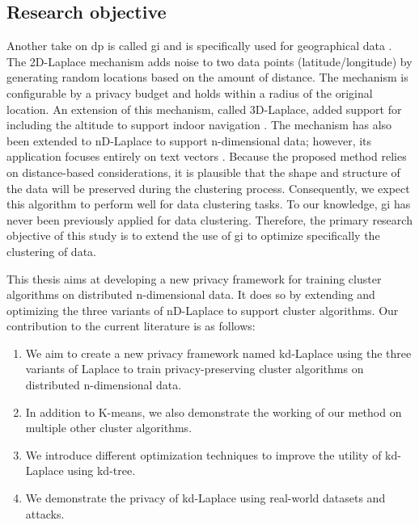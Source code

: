 \subsection*{Research objective}
Another take on \gls{dp} is called \gls{gi} and is specifically used for geographical data  \citep{DBLP:journals/corr/abs-1212-1984}.
The 2D-Laplace mechanism adds noise to two data points (latitude/longitude) by generating random locations based on the amount of distance.
The mechanism is configurable by a privacy budget and holds within a radius of the original location.
An extension of this mechanism, called 3D-Laplace, added support for including the altitude to support indoor navigation \citep{9646489}.
The mechanism has also been extended to nD-Laplace to support n-dimensional data; however, its application focuses entirely on text vectors \citep{fernandes_generalised_2019}. \newline
Because the proposed method relies on distance-based considerations, it is plausible that the shape and structure of the data will be preserved during the clustering process.
Consequently, we expect this algorithm to perform well for data clustering tasks.
To our knowledge, \gls{gi} has never been previously applied for data clustering.
Therefore, the primary research objective of this study is to extend the use of \gls{gi} to optimize specifically the clustering of data. \newline

This thesis aims at developing a new privacy framework for training cluster algorithms on distributed n-dimensional data.
It does so by extending and optimizing the three variants of nD-Laplace to support cluster algorithms.
Our contribution to the current literature is as follows:
\begin{enumerate}
  \item We aim to create a new privacy framework named kd-Laplace using the three variants of Laplace to train privacy-preserving cluster algorithms on distributed n-dimensional data.
  \item In addition to K-means, we also demonstrate the working of our method on multiple other cluster algorithms.
  \item We introduce different optimization techniques to improve the utility of kd-Laplace using kd-tree.
  \item We demonstrate the privacy of kd-Laplace using real-world datasets and attacks.
\end{enumerate}

